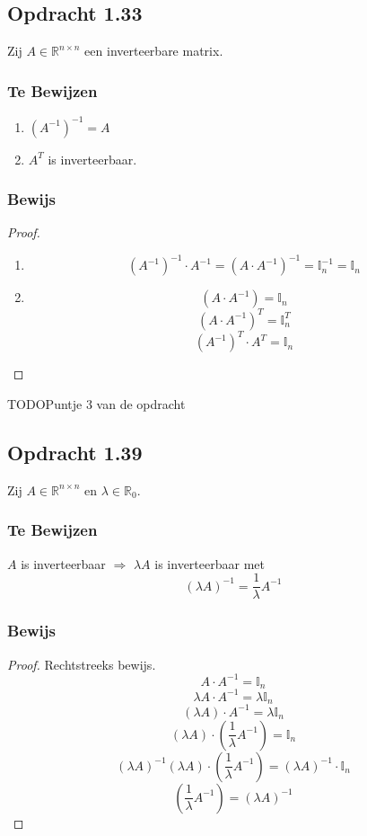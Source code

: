 \documentclass[lineaire_algebra_oplossingen.tex]{subfiles}
\begin{document}
\subsection{Opdracht 1.33}
\label{1.33}
Zij $A \in \mathbb{R}^{n\times n}$ een inverteerbare matrix.

\subsubsection*{Te Bewijzen}
\begin{enumerate}
\item $(A^{-1})^{-1} = A$
\item $A^T$ is inverteerbaar.
\end{enumerate}

\subsubsection*{Bewijs}
\begin{proof}
\begin{enumerate}
\item
\[
(A^{-1})^{-1}\cdot A^{-1} = (A \cdot A^{-1})^{-1} = \mathbb{I}_n^{-1} = \mathbb{I}_n
\]

\item
\[
(A\cdot A^{-1}) = \mathbb{I}_n
\]
\[
(A\cdot A^{-1})^T = \mathbb{I}_n^T
\]
\[
(A^{-1})^T \cdot A^T= \mathbb{I}_n
\]
\end{enumerate}
\end{proof}
TODO{Puntje 3 van de opdracht}

\subsection{Opdracht 1.39}
\label{1.39}
Zij $A\in \mathbb{R}^{n\times n}$ en $\lambda \in \mathbb{R}_0$.
\subsubsection*{Te Bewijzen}
$A$ is inverteerbaar $\Rightarrow$ $\lambda A$ is inverteerbaar met 
\[
(\lambda A)^{-1} = \frac{1}{\lambda}A^{-1}
\]

\subsubsection*{Bewijs}
\begin{proof}
Rechtstreeks bewijs.\\
\[
A\cdot A^{-1} = \mathbb{I}_n
\]
\[
\lambda A\cdot A^{-1} = \lambda\mathbb{I}_n
\]
\[
(\lambda A)\cdot A^{-1} = \lambda\mathbb{I}_n
\]
\[
(\lambda A)\cdot (\frac{1}{\lambda}A^{-1}) = \mathbb{I}_n
\]
$$(\lambda A)^{-1}(\lambda A)\cdot (\frac{1}{\lambda}A^{-1}) = (\lambda A)^{-1} \cdot \mathbb{I}_n$$
$$(\frac{1}{\lambda}A^{-1}) = (\lambda A)^{-1}$$
\end{proof}
\end{document}
